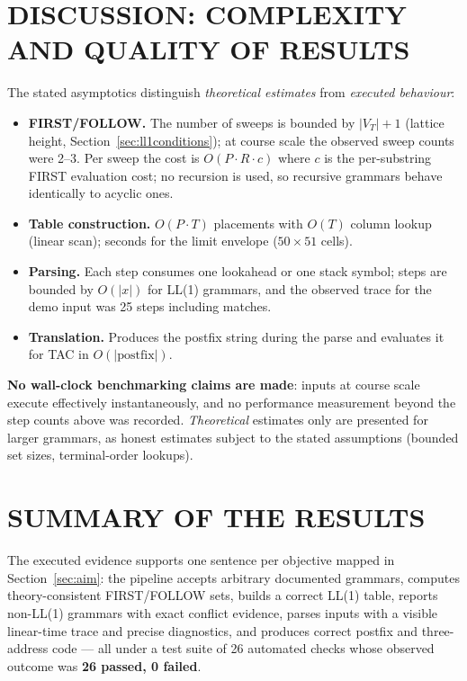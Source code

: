 \documentclass[12pt,a4paper,oneside,openany]{report}
\begin{document}
\section{DISCUSSION: COMPLEXITY AND QUALITY OF RESULTS}
\label{sec:complexity}
The stated asymptotics distinguish \emph{theoretical estimates} from
\emph{executed behaviour}:
\begin{itemize}
  \item \textbf{FIRST/FOLLOW.} The number of sweeps is bounded by
        $|V_T|{+}1$ (lattice height, Section~\ref{sec:ll1conditions}); at
        course scale the observed sweep counts were 2--3. Per sweep the
        cost is $O(P\cdot R \cdot c)$ where $c$ is the per-substring
        FIRST evaluation cost; no recursion is used, so recursive
        grammars behave identically to acyclic ones.
  \item \textbf{Table construction.} $O(P\cdot T)$ placements with
        $O(T)$ column lookup (linear scan); seconds for the limit
        envelope ($50 \times 51$ cells).
  \item \textbf{Parsing.} Each step consumes one lookahead or one stack
        symbol; steps are bounded by $O(|x|)$ for LL(1) grammars, and the
        observed trace for the demo input was 25 steps including
        matches.
  \item \textbf{Translation.} Produces the postfix string during the
        parse and evaluates it for TAC in $O(|\text{postfix}|)$.
\end{itemize}
\textbf{No wall-clock benchmarking claims are made}: inputs at course
scale execute effectively instantaneously, and no performance
measurement beyond the step counts above was recorded. \emph{Theoretical}
estimates only are presented for larger grammars, as honest estimates
subject to the stated assumptions (bounded set sizes, terminal-order
lookups).

\section{SUMMARY OF THE RESULTS}
The executed evidence supports one sentence per objective mapped in
Section~\ref{sec:aim}: the pipeline accepts arbitrary documented
grammars, computes theory-consistent FIRST/FOLLOW sets, builds a correct
LL(1) table, reports non-LL(1) grammars with exact conflict evidence,
parses inputs with a visible linear-time trace and precise diagnostics,
and produces correct postfix and three-address code --- all under a test
suite of 26 automated checks whose observed outcome was
\textbf{26 passed, 0 failed}.
\end{document}
